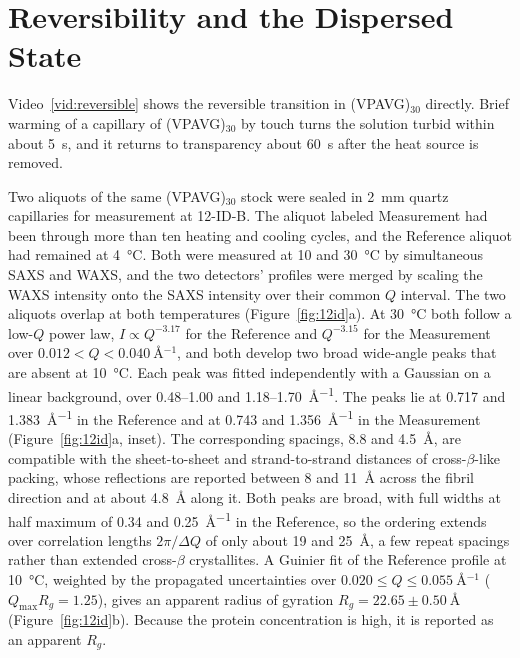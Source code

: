 \documentclass[11pt]{article}
\newcommand{\VP}[1]{(VPAVG)$_{#1}$}
\begin{document}
\section{Reversibility and the Dispersed State}

Video~\ref{vid:reversible} shows the reversible transition in \VP{30} directly. Brief warming of a capillary of \VP{30} by touch turns the solution turbid within about \SI{5}{\second}, and it returns to transparency about \SI{60}{\second} after the heat source is removed.

Two aliquots of the same \VP{30} stock were sealed in \SI{2}{\milli\meter} quartz capillaries for measurement at 12-ID-B. The aliquot labeled Measurement had been through more than ten heating and cooling cycles, and the Reference aliquot had remained at \SI{4}{\degreeCelsius}. Both were measured at 10 and \SI{30}{\degreeCelsius} by simultaneous SAXS and WAXS, and the two detectors' profiles were merged by scaling the WAXS intensity onto the SAXS intensity over their common $Q$ interval.\cite{APS12IDB,Xu2022-12IDB,Zheng2022-12IDB} The two aliquots overlap at both temperatures (Figure~\ref{fig:12id}a). At \SI{30}{\degreeCelsius} both follow a low-$Q$ power law, $I\propto Q^{-3.17}$ for the Reference and $Q^{-3.15}$ for the Measurement over $0.012<Q<\SI{0.040}{\angstrom^{-1}}$, and both develop two broad wide-angle peaks that are absent at \SI{10}{\degreeCelsius}. Each peak was fitted independently with a Gaussian on a linear background, over 0.48--1.00 and 1.18--\SI{1.70}{\angstrom^{-1}}. The peaks lie at 0.717 and \SI{1.383}{\angstrom^{-1}} in the Reference and at 0.743 and \SI{1.356}{\angstrom^{-1}} in the Measurement (Figure~\ref{fig:12id}a, inset). The corresponding spacings, 8.8 and \SI{4.5}{\angstrom}, are compatible with the sheet-to-sheet and strand-to-strand distances of cross-$\beta$-like packing, whose reflections are reported between 8 and \SI{11}{\angstrom} across the fibril direction and at about \SI{4.8}{\angstrom} along it.\cite{Sunde1997-jmb,Sawaya2007-nature} Both peaks are broad, with full widths at half maximum of 0.34 and \SI{0.25}{\angstrom^{-1}} in the Reference, so the ordering extends over correlation lengths $2\pi/\Delta Q$ of only about 19 and \SI{25}{\angstrom}, a few repeat spacings rather than extended cross-$\beta$ crystallites. A Guinier fit of the Reference profile at \SI{10}{\degreeCelsius}, weighted by the propagated uncertainties over $0.020\leq Q\leq\SI{0.055}{\angstrom^{-1}}$ ($Q_{\max}R_g=1.25$), gives an apparent radius of gyration $R_g=22.65\pm\SI{0.50}{\angstrom}$ (Figure~\ref{fig:12id}b). Because the protein concentration is high, it is reported as an apparent $R_g$.
\end{document}
